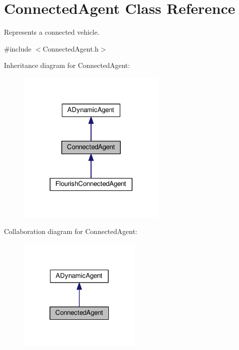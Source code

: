 \hypertarget{classConnectedAgent}{}\section{Connected\+Agent Class Reference}
\label{classConnectedAgent}


Represents a connected vehicle.  




{\ttfamily \#include $<$Connected\+Agent.\+h$>$}



Inheritance diagram for Connected\+Agent\+:\nopagebreak
\begin{figure}[H]
\begin{center}
\leavevmode
\includegraphics[width=204pt]{classConnectedAgent__inherit__graph}
\end{center}
\end{figure}


Collaboration diagram for Connected\+Agent\+:\nopagebreak
\begin{figure}[H]
\begin{center}
\leavevmode
\includegraphics[width=169pt]{classConnectedAgent__coll__graph}
\end{center}
\end{figure}
